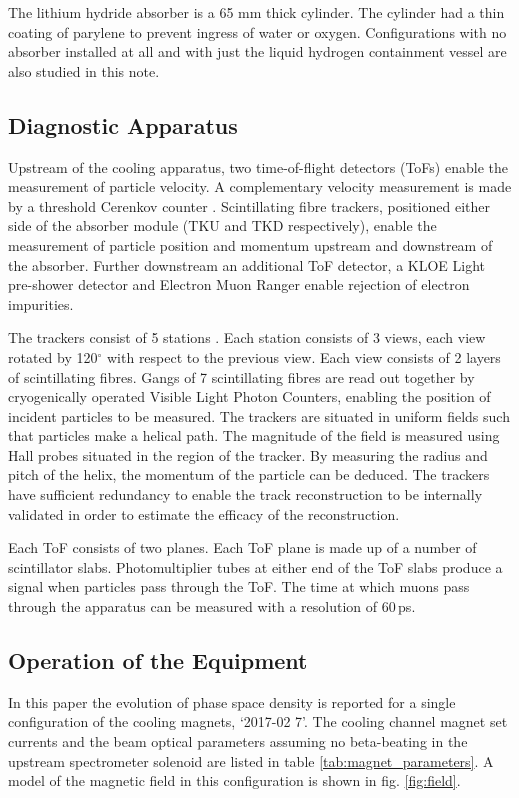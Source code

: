 The lithium hydride absorber is a 65 mm thick cylinder. The cylinder had a thin
coating of parylene to prevent ingress of water or oxygen. Configurations with 
no absorber installed at all and with just the liquid hydrogen containment 
vessel are also studied in this note.

\subsection{Diagnostic Apparatus}
Upstream of the cooling apparatus, two time-of-flight detectors (ToFs) 
\cite{tof} \cite{tof2} enable the measurement of particle velocity. A 
complementary velocity measurement is made by a threshold Cerenkov counter 
\cite{ckov}. Scintillating fibre 
trackers, positioned either side of the absorber module (TKU and TKD respectively), enable the measurement 
of particle position and momentum upstream and downstream of the absorber. 
Further downstream an additional ToF detector, a KLOE Light pre-shower detector 
and Electron Muon Ranger enable rejection of electron impurities.

The trackers consist of 5 stations \cite{tracker_hardware} 
\cite{tracker_software}. Each station consists of 3 views, each view rotated by 
120$^\circ$ with respect to the previous view. Each view consists of 2 layers of 
scintillating fibres. Gangs of 7 scintillating fibres are read out together by 
cryogenically operated Visible Light Photon Counters, enabling the position of 
incident particles to be measured. The 
trackers are situated in uniform fields such that particles make a helical 
path. The magnitude of the field is measured using Hall probes situated in the 
region of the tracker. By measuring the radius and pitch of the helix, the 
momentum of the particle can be deduced. The trackers have sufficient redundancy 
to enable the track reconstruction to be internally validated in order to 
estimate the efficacy of the reconstruction.

Each ToF consists of two planes. Each ToF plane is made up of a number of 
scintillator slabs. Photomultiplier tubes at either end of the ToF slabs produce 
a signal when particles pass through the ToF. The time at which muons pass 
through the apparatus can be measured with a resolution of 60\,ps.

\subsection{Operation of the Equipment}
In this paper the evolution of phase space density is reported for a single 
configuration of the cooling magnets,  `2017-02 7'. The 
cooling channel magnet set currents and the beam optical parameters assuming no
beta-beating in the upstream spectrometer solenoid are listed in table 
\ref{tab:magnet_parameters}. A  model of the magnetic field in this 
configuration is shown in fig. \ref{fig:field}.

